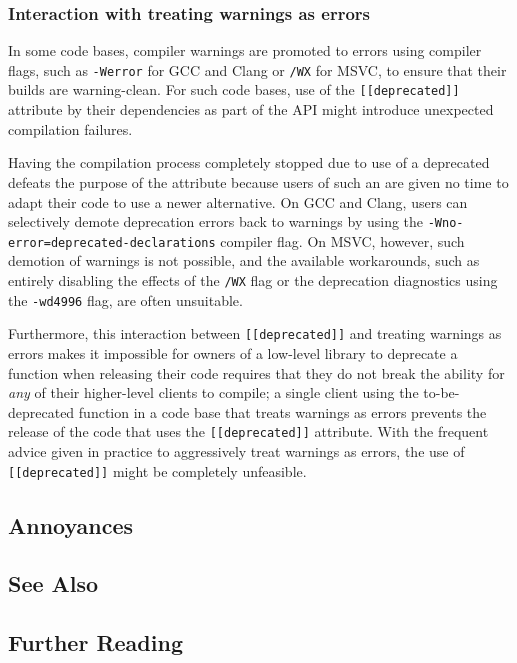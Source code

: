 \subsubsection[Interaction with treating warnings as errors]{Interaction with treating warnings as errors}\label{interaction-with--werror-(e.g,-gcc,-clang)-or-/wx-(msvc)}

In some code bases, compiler warnings are promoted to errors using compiler flags, such as \lstinline!-Werror! for GCC and Clang or \lstinline!/WX! for MSVC, to ensure that their builds are warning-clean. For such code bases, use of the \lstinline![[deprecated]]! attribute by their dependencies as part of the API might introduce unexpected compilation failures. 

Having the compilation process completely stopped due to use of a
deprecated  defeats the purpose of the attribute because users of such an  are given no time to adapt their code
to use a newer alternative. On GCC and Clang, users can selectively demote deprecation errors back to warnings by using the
\lstinline!-Wno-error=deprecated-declarations! compiler flag. On MSVC,
however, such demotion of warnings is not possible, and the available workarounds, such as entirely disabling the effects of the \lstinline!/WX! flag or the deprecation diagnostics using the  \lstinline!-wd4996! flag, are often unsuitable.

Furthermore, this interaction between \lstinline![[deprecated]]! and
treating warnings as errors makes it impossible for owners of a low-level library
to deprecate a function when releasing their code requires that they do
not break the ability for \emph{any} of their higher-level clients to compile;
a single client using the to-be-deprecated function in a code base that treats warnings as errors prevents the release of the code that uses the
\lstinline![[deprecated]]! attribute. With the frequent advice given in practice to  aggressively treat warnings as errors, the use of
\lstinline![[deprecated]]! might be completely unfeasible.

\newpage%
\subsection[Annoyances]{Annoyances}\label{annoyances}

\hspace{\fill}

\subsection[See Also]{See Also}\label{see-also}

\hspace{\fill}

\subsection[Further Reading]{Further Reading}\label{further-reading}

\hspace{\fill}



